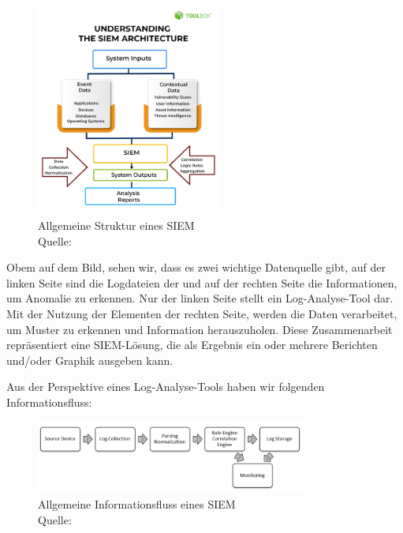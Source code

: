 \begin{figure}[H]
   \centering
   \includegraphics[width=0.55\textwidth]{assets/2_p1.png}
   \caption[Allgemeine Struktur von \gls{SIEM}]
   {Allgemeine Struktur eines \gls{SIEM}\\Quelle: \citep{Mohanan_What} }
   \label{fig:SIEM_Allg_Struktur}
   \centering
\end{figure}

Obem auf dem Bild, sehen wir, dass es zwei wichtige Datenquelle gibt, auf der linken Seite sind die Logdateien der  und auf der rechten Seite die Informationen, um Anomalie zu erkennen. Nur der linken Seite stellt ein Log-Analyse-Tool dar. Mit der Nutzung der Elementen der rechten Seite, werden die Daten verarbeitet, um Muster zu erkennen und Information herauszuholen. Diese Zusammenarbeit repräsentiert eine \gls{SIEM}-Lösung, die als Ergebnis ein oder mehrere Berichten und/oder Graphik ausgeben kann. 

Aus der Perspektive eines Log-Analyse-Tools haben wir folgenden Informationsfluss:

\begin{figure}[H]
   \centering
   \includegraphics[width=0.8\textwidth]{assets/2_p2.png}
   \caption[Allgemeine Informationsfluss von \gls{SIEM}]
   {Allgemeine Informationsfluss eines \gls{SIEM} \\Quelle: \citep{Granadillo_SIEM} }
   \label{fig:SIEM_Allg_Informationsfluss}
   \centering
\end{figure}


